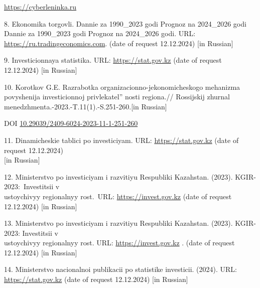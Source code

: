 \begin{references}
\href{https://cyberleninka.ru/article/n/organizatsionno-ekonomicheskiy-mehanizm-upravleniya-investitsionnym-protsessom-v-regione}{https://cyberleninka.ru}

8. Ekonomika torgovli. Dannie za 1990\_2023 godi \textbar{} Prognoz na
2024\_2026 godi Dannie za 1990\_2023 godi \textbar{} Prognoz na
2024\_2026 godi. URL:
\href{https://ru.tradingeconomics.com/kazakhstan/gdp}{https://ru.tradingeconomics.com}. (date of request
12.12.2024) {[}in Russian{]}

9. Investicionnaya statistika. URL:
\href{https://stat.gov.kz/ru/industries/business-statistics/stat-invest/publications/5203/}{https://stat.gov.kz}
(date of request 12.12.2024) {[}in Russian{]}

10. Korotkov G.E. Razrabotka organizacionno-jekonomicheskogo mehanizma
povyshenija investicionnoj
privlekatel'' nosti regiona.// Rossijskij
zhurnal menedzhmenta.-2023.-T.11(1).-S.251-260.{[}in Russian{]}

DOI \href{https://doi.org/10.29039/2409-6024-2023-11-1-251-260}{10.29039/2409-6024-2023-11-1-251-260}

11. Dinamicheskie tablici po investiciyam. URL:
\href{https://stat.gov.kz/ru/industries/business-statistics/stat-invest/dynamic-tables/}{https://stat.gov.kz}
(date of request 12.12.2024) \\{[}in Russian{]}

12. Ministerstvo po investiciyam i razvitiyu Respubliki
Kazahstan. (2023). KGIR-2023:~Investitsii v \\ustoychivyy regionalnyy
rost.~URL:
\href{https://invest.gov.kz/ru/media-center/press-releases/kgir-2023-investitsii-v-ustoychivyy-regionalnyy-rost/}{https://invest.gov.kz}
(date of request 12.12.2024) {[}in Russian{]}

13. Ministerstvo po investiciyam i razvitiyu Respubliki Kazahstan.
(2023). KGIR-2023: Investitsii v \\ustoychivyy regionalnyy rost. URL:
\href{https://invest.gov.kz/ru/media-center/press-releases/kgir-2023-investitsii-v-ustoychivyy-regionalnyy-rost/2023}{https://invest.gov.kz}
. (date of request 12.12.2024) {[}in Russian{]}

14. Ministerstvo nacionalnoi publikacii po statistike investicii. (2024).
URL:
\href{https://stat.gov.kz/ru/industries/business-statistics/stat-invest/publications/182352/}{https://stat.gov.kz}
(date of request 12.12.2024) {[}in Russian{]}
\end{references}

